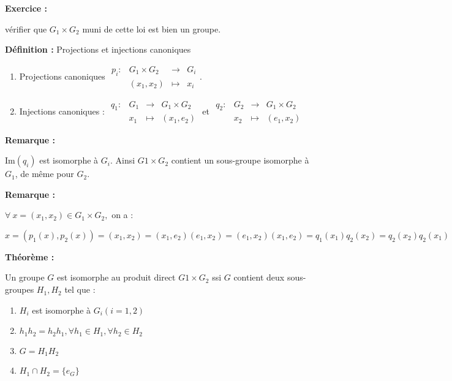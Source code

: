 \documentclass{report}
\newenvironment{definition}[1][]{
    \begin{tcolorbox}[colframe= white]
    \textbf{Définition :} 
    #1 \par
    }
    {\end{tcolorbox}}
\newenvironment{exo}{\begin{tcolorbox}[colframe= white]
    \textbf{Exercice :}
    \par}
    {\end{tcolorbox}}
\newenvironment{theoreme}[1][]{
    \begin{tcolorbox}[]
    \textbf{Théorème :} #1  \par} 
    {\end{tcolorbox}}
\newcommand{\remarque}{
    \noindent\textbf{Remarque :} \par
}
\newcommand{\im}[0]{\textrm{Im}}
\newcommand{\fonction}[5]{
    \begin{array}{l|rcl}
    #1: & #2 & \longrightarrow & #3 \\
        & #4 & \longmapsto & #5 
    \end{array}
}
\begin{document}
\begin{exo}
    vérifier que $G_1 \times G_2$ muni de cette loi est bien un groupe.
\end{exo}
\begin{definition}[Projections et injections canoniques]
\begin{enumerate}
    \item Projections canoniques $\fonction{p_i}{G_1 \times G_2}{G_i}{(x_1 ,x_2)}{x_i}$.
    \item Injections canoniques : $\fonction{q_1}{G_1}{G_1 \times G_2}{x_1}{(x_1 ,e_2)}$ et $\fonction{q_2}{G_2}{G_1 \times G_2}{x_2}{(e_1 ,x_2)}$
\end{enumerate}
\end{definition}

\remarque{$\im (q_i)$ est isomorphe à $G_i$. Ainsi $G1 \times G_2$ contient un sous-groupe isomorphe à $G_1$, de même pour $G_2$.}
    


\remarque{
$\forall ~x = (x_1 ,x_2) \in G_1 \times G_2,$ on a :\par
    $x = (p_1 (x), p_2 (x)) = (x_1 ,x_2) = (x_1 ,e_2)(e_1 ,x_2) = (e_1 ,x_2)(x_1 ,e_2) = q_1 (x_1)q_2 (x_2) = q_2(x_2)q_2(x_1)$}
    

\begin{theoreme}
    Un groupe $G$ est isomorphe au produit direct $G1 \times G_2$ ssi $G$ contient deux sous-groupes $H_1,H_2$ tel que :
    \begin{enumerate}
        \item $H_i$ est isomorphe à $G_i (i = 1,2)$
        \item $h_1 h_2 = h_2 h_1, \forall h_1\in H_1, \forall h_2\in H_2$
        \item $G = H_1 H_2$
        \item $H_1 \cap H_2 = \{e_G\}$
    \end{enumerate}
\end{theoreme}
\end{document}
